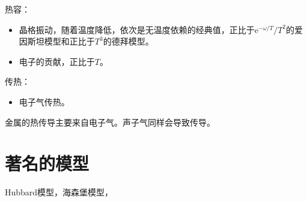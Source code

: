\documentclass[hyperref, UTF8, a4paper, oneside]{ctexbook}
\newcommand*{\ee}{\mathrm{e}}
\numberwithin{equation}{chapter}
\begin{document}
热容：
\begin{itemize}
    \item 晶格振动，随着温度降低，依次是无温度依赖的经典值，正比于$\ee^{- \omega / T} / T^2$的爱因斯坦模型和正比于$T^3$的德拜模型。
    \item 电子的贡献，正比于$T$。
\end{itemize}

传热：
\begin{itemize}
    \item 电子气传热。
\end{itemize}
金属的热传导主要来自电子气。声子气同样会导致传导。

\section{著名的模型}

Hubbard模型，海森堡模型，%


 
\end{document}
